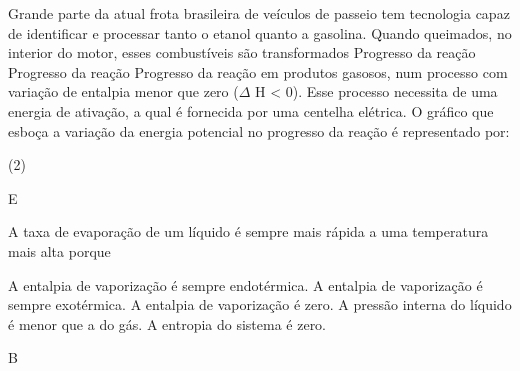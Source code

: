 \documentclass[9 pt]{scrartcl}
\def\PQ{0.84} %
\begin{document}
\begin{exercise}[points=\PQ]
Grande parte da atual frota brasileira de veículos de passeio tem tecnologia capaz de identificar e processar tanto o etanol quanto a gasolina. Quando queimados, no interior do motor, esses combustíveis são transformados Progresso da reação Progresso da reação Progresso da reação em produtos gasosos, num processo com variação de entalpia menor que zero (\(\Delta\) H < 0). Esse processo necessita de uma energia de ativação, a qual é fornecida por uma centelha elétrica.
O gráfico que esboça a variação da energia potencial no progresso da reação é representado por: 

\begin{choice}(2)
\choice \begin{endiagram}[x-label-text= reação,	y-label-text=Energia,scale=0.5]
\end{endiagram}

\choice \begin{endiagram}	[x-label-text=Reação,	y-label-text=Energia, scale=0.5]
 \end{endiagram}

\choice  \begin{endiagram}	[x-label-text=Reação,	y-label-text=Energia, scale=0.5]
 \end{endiagram}


\choice \begin{endiagram}	[x-label-text=Reação,	y-label-text=Energia, scale=0.5]
 \end{endiagram}

\choice \begin{endiagram}	[x-label-text=Reação,	y-label-text=Energia, scale=0.5]
 \end{endiagram}

\end{choice}
\end{exercise}
\begin{solution}
E
\end{solution}





\begin{exercise}[points=\PQ]
A taxa de evaporação de um líquido é sempre mais rápida a uma temperatura mais alta porque

\begin{choice}
\choice A entalpia de vaporização é sempre endotérmica.
\choice A entalpia de vaporização é sempre exotérmica.
\choice A entalpia de vaporização é zero.
\choice A pressão interna do líquido é menor que a do gás.
\choice A entropia do sistema é zero.
\end{choice}
\end{exercise}
\begin{solution}
B
\end{solution}
\end{document}
